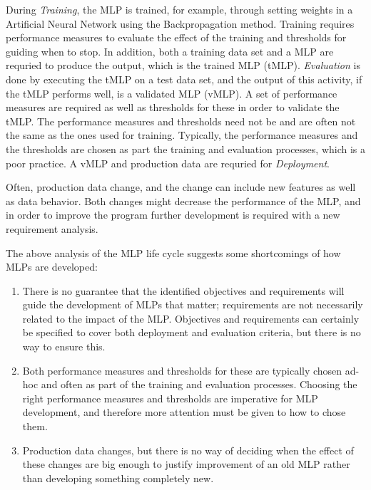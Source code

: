\documentclass{article}
\begin{document}
During \emph{Training}, the MLP is trained, for example, through setting weights in a Artificial Neural Network using the Backpropagation method.
Training requires performance measures to evaluate the effect of the training and thresholds for guiding when to stop.
In addition, both a training data set and a MLP are requried to produce the output, which is the trained MLP (tMLP).
\emph{Evaluation} is done by executing the tMLP on a test data set, and the output of this activity, if the tMLP performs well, is a validated MLP (vMLP). 
A set of performance measures are required as well as thresholds for these in order to validate the tMLP.
The performance measures and thresholds need not be and are often not the same as the ones used for training.
Typically, the performance measures and the thresholds are chosen as part the training and evaluation processes, which is a poor practice.
A vMLP and production data are requried for \emph{Deployment}.

Often, production data change, and the change can include new features as well as data behavior. 
Both changes might decrease the performance of the MLP, and in order to improve the program further development is required with a new requirement analysis.

The above analysis of the MLP life cycle suggests some shortcomings of how MLPs are developed:
\begin{enumerate}

\item
There is no guarantee that the identified objectives and requirements will guide the development of MLPs that matter; requirements are not necessarily related to the impact of the MLP.
Objectives and requirements can certainly be specified to cover both deployment and evaluation criteria, but there is no way to ensure this.

\item
Both performance measures and thresholds for these are typically chosen ad-hoc and often as part of the training and evaluation processes.
Choosing the right performance measures and thresholds are imperative for MLP development, and therefore more attention must be given to how to chose them.

\item
Production data changes, but there is no way of deciding when the effect of these changes are big enough to justify improvement of an old MLP rather than developing something completely new.

\end{enumerate}
\end{document}
